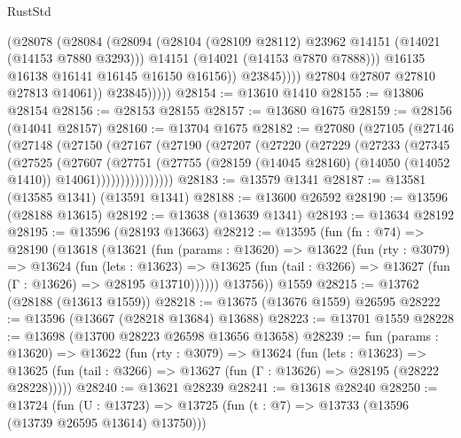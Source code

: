 \begin{lexlean}{RustStd}
\begin{coremodule}
                          (@28078
                            (@28084
                              (@28094
                                (@28104 (@28109 @28112) @23962 @14151 (@14021 (@14153 @7880 @3293)))
                                @14151
                                (@14021 (@14153 @7870 @7888)))
                              @16135
                              @16138
                              @16141
                              @16145
                              @16150
                              @16156))
                          @23845))))
                  @27804
                  @27807
                  @27810
                  @27813
                  @14061))
              @23845)))))
@28154 := @13610 @1410
@28155 := @13806 @28154
@28156 := @28153 @28155
@28157 := @13680 @1675
@28159 := @28156 (@14041 @28157)
@28160 := @13704 @1675
@28182 := @27080
    (@27105
      (@27146
        (@27148
          (@27150
            (@27167
              (@27190
                (@27207
                  (@27220
                    (@27229
                      (@27233
                        (@27345
                          (@27525
                            (@27607
                              (@27751
                                (@27755
                                  (@28159
                                    (@14045 @28160)
                                    (@14050 (@14052 @1410))
                                    @14061))))))))))))))))
@28183 := @13579 @1341
@28187 := @13581 (@13585 @1341) (@13591 @1341)
@28188 := @13600 @26592
@28190 := @13596 (@28188 @13615)
@28192 := @13638 (@13639 @1341)
@28193 := @13634 @28192
@28195 := @13596 (@28193 @13663)
@28212 := @13595
    (fun (fn : @74) =>
    @28190
      (@13618
        (@13621
          (fun (params : @13620) =>
          @13622
            (fun (rty : @3079) =>
            @13624
              (fun (lets : @13623) =>
              @13625 (fun (tail : @3266) => @13627 (fun (Γ : @13626) => @28195 @13710))))))
        @13756))
    @1559
@28215 := @13762 (@28188 (@13613 @1559))
@28218 := @13675 (@13676 @1559) @26595
@28222 := @13596 (@13667 (@28218 @13684) @13688)
@28223 := @13701 @1559
@28228 := @13698 (@13700 @28223 @26598 @13656 @13658)
@28239 := fun (params : @13620) =>
  @13622
    (fun (rty : @3079) =>
    @13624
      (fun (lets : @13623) =>
      @13625 (fun (tail : @3266) => @13627 (fun (Γ : @13626) => @28195 (@28222 @28228)))))
@28240 := @13621 @28239
@28241 := @13618 @28240
@28250 := @13724
    (fun (U : @13723) => @13725 (fun (t : @7) => @13733 (@13596 (@13739 @26595 @13614) @13750)))

\end{coremodule}
\end{lexlean}
